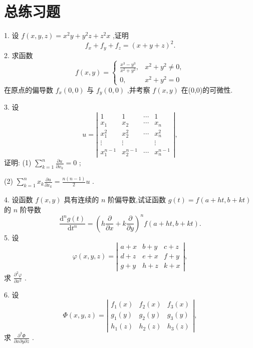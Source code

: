 \section{总练习题}

1. 设 \(f\left( {x,y,z}\right)  = {x}^{2}y + {y}^{2}z + {z}^{2}x\) ,证明
\[
{f}_{x} + {f}_{y} + {f}_{z} = {\left( x + y + z\right) }^{2}.
\]
2. 求函数
\[
f\left( {x,y}\right)  = \left\{  \begin{matrix} \frac{{x}^{3} - {y}^{3}}{{x}^{2} + {y}^{2}}, & {x}^{2} + {y}^{2} \neq  0, \\  0, & {x}^{2} + {y}^{2} = 0 \end{matrix}\right.
\]
在原点的偏导数 \({f}_{x}\left( {0,0}\right)\) 与 \({f}_{y}\left( {0,0}\right)\) ,并考察 \(f\left( {x,y}\right)\) 在(0,0)的可微性.

3. 设
\[
u = \left| \begin{matrix} 1 & 1 & \cdots & 1 \\  {x}_{1} & {x}_{2} & \cdots & {x}_{n} \\  {x}_{1}^{2} & {x}_{2}^{2} & \cdots & {x}_{n}^{2} \\  \vdots & \vdots & & \vdots \\  {x}_{1}^{n - 1} & {x}_{2}^{n - 1} & \cdots & {x}_{n}^{n - 1} \end{matrix}\right| ,
\]
证明: (1) \(\mathop{\sum }\limits_{{k = 1}}^{n}\frac{\partial u}{\partial {x}_{k}} = 0\) ;

(2) \(\mathop{\sum }\limits_{{k = 1}}^{n}{x}_{k}\frac{\partial u}{\partial {x}_{k}} = \frac{n\left( {n - 1}\right) }{2}u\) .

4. 设函数 \(f\left( {x,y}\right)\) 具有连续的 \(n\) 阶偏导数,试证函数 \(g\left( t\right)  = f\left( {a + {ht},b + {kt}}\right)\) 的 \(n\) 阶导数
\[
\frac{{\mathrm{d}}^{n}g\left( t\right) }{\mathrm{d}{t}^{n}} = {\left( h\frac{\partial }{\partial x} + k\frac{\partial }{\partial y}\right) }^{n}f\left( {a + {ht},b + {kt}}\right) .
\]
5. 设
\[
\varphi \left( {x,y,z}\right)  = \left| \begin{array}{lll} a + x & b + y & c + z \\  d + z & e + x & f + y \\  g + y & h + z & k + x \end{array}\right| ,
\]
求 \(\frac{{\partial }^{2}\varphi }{\partial {x}^{2}}\) .

6. 设
\[
\Phi \left( {x,y,z}\right)  = \left| \begin{array}{lll} {f}_{1}\left( x\right) & {f}_{2}\left( x\right) & {f}_{3}\left( x\right) \\  {g}_{1}\left( y\right) & {g}_{2}\left( y\right) & {g}_{3}\left( y\right) \\  {h}_{1}\left( z\right) & {h}_{2}\left( z\right) & {h}_{3}\left( z\right)  \end{array}\right| ,
\]
求 \(\frac{{\partial }^{3}\Phi }{\partial x\partial y\partial z}\) .

